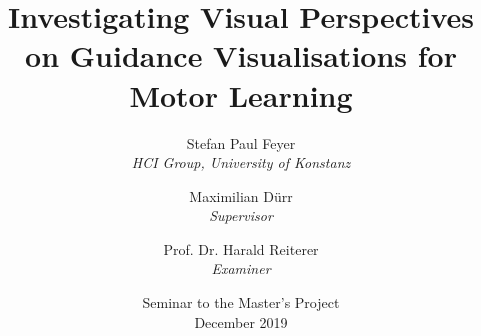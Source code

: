 \documentclass[12pt,a4paper,twoside,titlepage]{memoir}
\title{Investigating Visual Perspectives on Guidance Visualisations for Motor Learning}
\author{Stefan Paul Feyer\\
	\textit{HCI Group, University of Konstanz}
	\and
	Maximilian Dürr\\
	\textit{Supervisor}
	\and
	Prof. Dr. Harald Reiterer\\
	\textit{Examiner}
}
\date{Seminar to the Master's Project \\December 2019}
\begin{document}
	\maketitle
	\thispagestyle{empty}
	\frontmatter
	
	\begin{KeepFromToc}
		\tableofcontents
	\end{KeepFromToc}
	\listoffigures
	\listoftables
	\mainmatter
	
	
	
	
	
	
\end{document}

